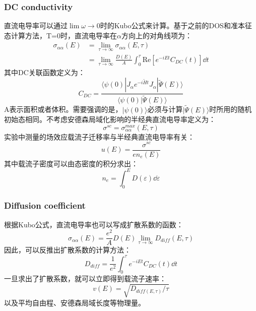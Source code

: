 \subsubsection{DC conductivity}
直流电导率可以通过$\lim \omega\rightarrow0$时的Kubo公式来计算。基于之前的DOS和准本征态计算方法，T=0时，直流电导率在$\alpha$方向上的对角线项为：
\begin{equation}
    \begin{aligned}
        \sigma_{\alpha\alpha}(E)&=\lim_{\tau\rightarrow\infty}\sigma_{\alpha\alpha}(E,\tau)\\
        &=\lim_{\tau\rightarrow\infty}\frac{D(E)}{A}\int_{0}^{\tau}\text{Re}[e^{-iEt}C_{DC}(t)]\dd{t}
    \end{aligned}
\end{equation}
其中DC关联函数定义为：
\begin{equation}
    C_{DC}=\frac{\langle\psi(0)|J_{\alpha}e^{-i\tilde{H}t}J_{\alpha}|\tilde{\Psi}(E)\rangle}{\langle\psi(0)|\tilde{\Psi}(E)\rangle}
\end{equation}
A表示面积或者体积。需要强调的是，$|\psi(0)\rangle$必须与计算$|\tilde{\Psi}(E)\rangle$时所用的随机初始态相同。不考虑安德森局域化影响的半经典直流电导率定义为：
\begin{equation}
    \sigma^{sc}=\sigma^{max}_{\alpha\alpha}(E,\tau)
\end{equation}
实验中测量的场效应载流子迁移率与半经典直流电导率有关：
\begin{equation}
    u(E)=\frac{\sigma^{sc}}{en_{e}(E)}
\end{equation}
其中载流子密度可以由态密度的积分求出：
\begin{equation}
    n_{e}=\int_{0}^{E}D(\varepsilon)\dd{\varepsilon}
\end{equation}
\subsubsection{Diffusion coefficient}
根据Kubo公式，直流电导率也可以写成扩散系数的函数：
\begin{equation}
    \sigma_{\alpha\alpha}(E)=\frac{e^2}{A}D(E)\lim_{\tau\rightarrow\infty}D_{diff}(E,\tau)
\end{equation}
因此，可以反推出扩散系数的计算方法：
\begin{equation}
    D_{diff}=\frac{1}{e^2}\int_{0}^{\tau}e^{-iEt}C_{DC}(t)\dd{t}
\end{equation}
一旦求出了扩散系数，就可以立即得到载流子速率：
\begin{equation}
    v(E)=\sqrt{D_{diff(E,\tau)}/\tau}
\end{equation}
以及平均自由程、安德森局域长度等物理量。
